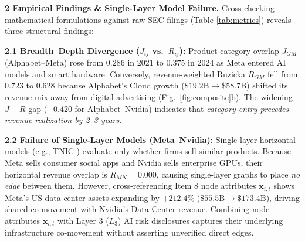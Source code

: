 \documentclass[10pt,letterpaper,twocolumn]{article}
\begin{document}
\vspace*{0.1cm}
\noindent\textbf{2 Empirical Findings \& Single-Layer Model Failure.} Cross-checking mathematical formulations against raw SEC filings (Table \ref{tab:metrics}) reveals three structural findings:

\textbf{2.1 Breadth--Depth Divergence ($J_{ij}$ vs.\ $R_{ij}$):}
Product category overlap $J_{GM}$ (Alphabet--Meta) rose from $0.286$ in 2021 to $0.375$ in 2024 as Meta entered AI models and smart hardware. Conversely, revenue-weighted Ruzicka $R_{GM}$ fell from $0.723$ to $0.628$ because Alphabet's Cloud growth ($\$19.2\text{B} \to \$58.7\text{B}$) shifted its revenue mix away from digital advertising (Fig.\ \ref{fig:composite}b). The widening $J - R$ gap ($+0.420$ for Alphabet--Nvidia) indicates that \textit{category entry precedes revenue realization by 2--3 years}.

\textbf{2.2 Failure of Single-Layer Models (Meta--Nvidia):} 
Single-layer horizontal models (e.g., TNIC \cite{hoberg2016}) evaluate only whether firms sell similar products. Because Meta sells consumer social apps and Nvidia sells enterprise GPUs, their horizontal revenue overlap is $R_{MN} = 0.000$, causing single-layer graphs to place \textit{no edge} between them. However, cross-referencing Item 8 node attributes $\mathbf{x}_{i,t}$ shows Meta's US data center assets expanding by $+212.4\%$ ($\$55.5\text{B} \to \$173.4\text{B}$), driving shared co-movement with Nvidia's Data Center revenue. Combining node attributes $\mathbf{x}_{i,t}$ with Layer 3 ($L_3$) AI risk disclosures captures their underlying infrastructure co-movement without asserting unverified direct edges.
\end{document}
